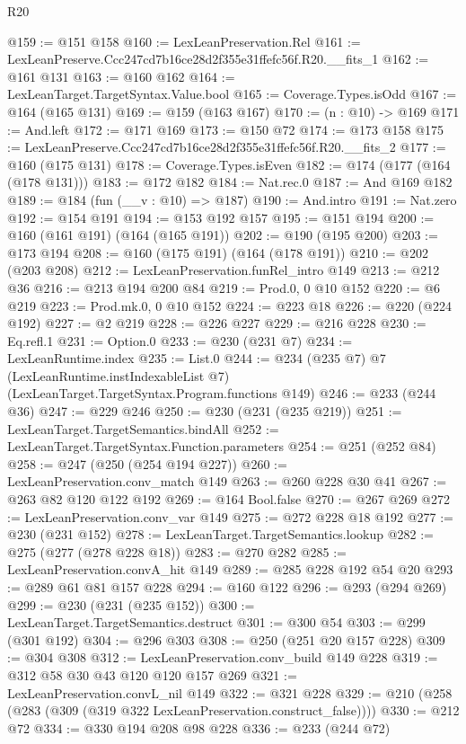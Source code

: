 \begin{lexlean}{R20}
\begin{coremodule}
@159 := @151 @158
@160 := LexLeanPreservation.Rel
@161 := LexLeanPreserve.Ccc247cd7b16ce28d2f355e31ffefc56f.R20.__fits_1
@162 := @161 @131
@163 := @160 @162
@164 := LexLeanTarget.TargetSyntax.Value.bool
@165 := Coverage.Types.isOdd
@167 := @164 (@165 @131)
@169 := @159 (@163 @167)
@170 := (n : @10) -> @169
@171 := And.left
@172 := @171 @169
@173 := @150 @72
@174 := @173 @158
@175 := LexLeanPreserve.Ccc247cd7b16ce28d2f355e31ffefc56f.R20.__fits_2
@177 := @160 (@175 @131)
@178 := Coverage.Types.isEven
@182 := @174 (@177 (@164 (@178 @131)))
@183 := @172 @182
@184 := Nat.rec.{0}
@187 := And @169 @182
@189 := @184 (fun (__v : @10) => @187)
@190 := And.intro
@191 := Nat.zero
@192 := @154 @191
@194 := @153 @192 @157
@195 := @151 @194
@200 := @160 (@161 @191) (@164 (@165 @191))
@202 := @190 (@195 @200)
@203 := @173 @194
@208 := @160 (@175 @191) (@164 (@178 @191))
@210 := @202 (@203 @208)
@212 := LexLeanPreservation.funRel_intro @149
@213 := @212 @36
@216 := @213 @194 @200 @84
@219 := Prod.{0, 0} @10 @152
@220 := @6 @219
@223 := Prod.mk.{0, 0} @10 @152
@224 := @223 @18
@226 := @220 (@224 @192)
@227 := @2 @219
@228 := @226 @227
@229 := @216 @228
@230 := Eq.refl.{1}
@231 := Option.{0}
@233 := @230 (@231 @7)
@234 := LexLeanRuntime.index
@235 := List.{0}
@244 := @234
    (@235 @7)
    @7
    (LexLeanRuntime.instIndexableList @7)
    (LexLeanTarget.TargetSyntax.Program.functions @149)
@246 := @233 (@244 @36)
@247 := @229 @246
@250 := @230 (@231 (@235 @219))
@251 := LexLeanTarget.TargetSemantics.bindAll
@252 := LexLeanTarget.TargetSyntax.Function.parameters
@254 := @251 (@252 @84)
@258 := @247 (@250 (@254 @194 @227))
@260 := LexLeanPreservation.conv_match @149
@263 := @260 @228 @30 @41
@267 := @263 @82 @120 @122 @192
@269 := @164 Bool.false
@270 := @267 @269
@272 := LexLeanPreservation.conv_var @149
@275 := @272 @228 @18 @192
@277 := @230 (@231 @152)
@278 := LexLeanTarget.TargetSemantics.lookup
@282 := @275 (@277 (@278 @228 @18))
@283 := @270 @282
@285 := LexLeanPreservation.convA_hit @149
@289 := @285 @228 @192 @54 @20
@293 := @289 @61 @81 @157 @228
@294 := @160 @122
@296 := @293 (@294 @269)
@299 := @230 (@231 (@235 @152))
@300 := LexLeanTarget.TargetSemantics.destruct
@301 := @300 @54
@303 := @299 (@301 @192)
@304 := @296 @303
@308 := @250 (@251 @20 @157 @228)
@309 := @304 @308
@312 := LexLeanPreservation.conv_build @149 @228
@319 := @312 @58 @30 @43 @120 @120 @157 @269
@321 := LexLeanPreservation.convL_nil @149
@322 := @321 @228
@329 := @210 (@258 (@283 (@309 (@319 @322 LexLeanPreservation.construct_false))))
@330 := @212 @72
@334 := @330 @194 @208 @98 @228
@336 := @233 (@244 @72)

\end{coremodule}
\end{lexlean}
